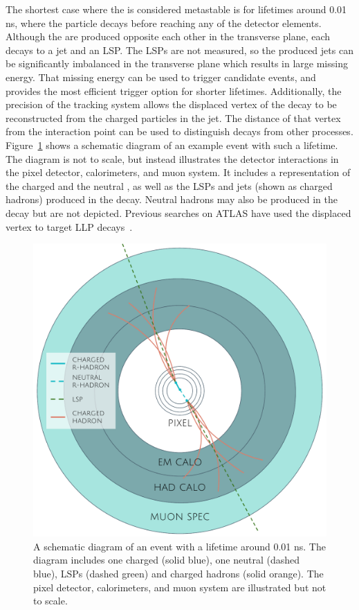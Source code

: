 The shortest case where the \rhadron is considered metastable is for lifetimes around 0.01 ns, where the particle decays before reaching any of the detector elements.
Although the \rhadrons are produced opposite each other in the transverse plane, each \rhadron decays to a jet and an \ac{LSP}.
The \acp{LSP} are not measured, so the produced jets can be significantly imbalanced in the transverse plane which results in large missing energy.
That missing energy can be used to trigger candidate events, and provides the most efficient trigger option for shorter lifetimes.
Additionally, the precision of the tracking system allows the displaced vertex of the \rhadron decay to be reconstructed from the charged particles in the jet.
The distance of that vertex from the interaction point can be used to distinguish \rhadron decays from other processes.
Figure~\ref{fig:rhadron_displaced} shows a schematic diagram of an example \rhadron event with such a lifetime.
The diagram is not to scale, but instead illustrates the detector interactions in the pixel detector, calorimeters, and muon system.
It includes a representation of the charged \rhadron and the neutral \rhadron, as well as the \acp{LSP} and jets (shown as charged hadrons) produced in the decay.
Neutral hadrons may also be produced in the decay but are not depicted.
Previous searches on \ac{ATLAS} have used the displaced vertex to target \ac{LLP} decays~\cite{SUSY-2014-02}.

\begin{figure}[h!]
\centering
\includegraphics[width=\halffig]{figures/rhadron_displaced.pdf}
\caption{A schematic diagram of an \rhadron event with a lifetime around 0.01 ns. The diagram includes one charged \rhadron (solid blue), one neutral \rhadron (dashed blue), \acp{LSP} (dashed green) and charged hadrons (solid orange). The pixel detector, calorimeters, and muon system are illustrated but not to scale.}
\label{fig:rhadron_displaced}
\end{figure}

